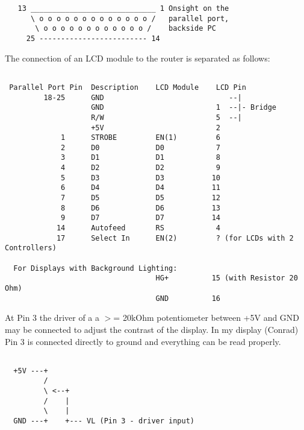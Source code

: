 \begin{example}
\begin{verbatim}
   13 _____________________________ 1 Onsight on the
      \ o o o o o o o o o o o o o /   parallel port,
       \ o o o o o o o o o o o o /    backside PC
     25 ------------------------- 14
\end{verbatim}
\end{example}
   

The connection of an LCD module to the router is separated as follows:
 
\begin{example}
\begin{verbatim}
 
 Parallel Port Pin  Description    LCD Module    LCD Pin
         18-25      GND                             --|
                    GND                          1  --|- Bridge
                    R/W                          5  --|
                    +5V                          2
             1      STROBE         EN(1)         6
             2      D0             D0            7
             3      D1             D1            8
             4      D2             D2            9
             5      D3             D3           10
             6      D4             D4           11
             7      D5             D5           12
             8      D6             D6           13
             9      D7             D7           14
            14      Autofeed       RS            4
            17      Select In      EN(2)         ? (for LCDs with 2 Controllers)

  For Displays with Background Lighting:
                                   HG+          15 (with Resistor 20 Ohm)
                                   GND          16
\end{verbatim}
\end{example}

  At Pin 3 the driver of a a $>$= 20kOhm potentiometer between +5V and GND may
  be connected to adjust the contrast of the display.
  In my display (Conrad) Pin 3 is connected directly to ground and everything
  can be read properly.
  
\begin{example}
\begin{verbatim}
  
  +5V ---+
         /
         \ <--+
         /    |
         \    |
  GND ---+    +--- VL (Pin 3 - driver input)
\end{verbatim}
\end{example}



